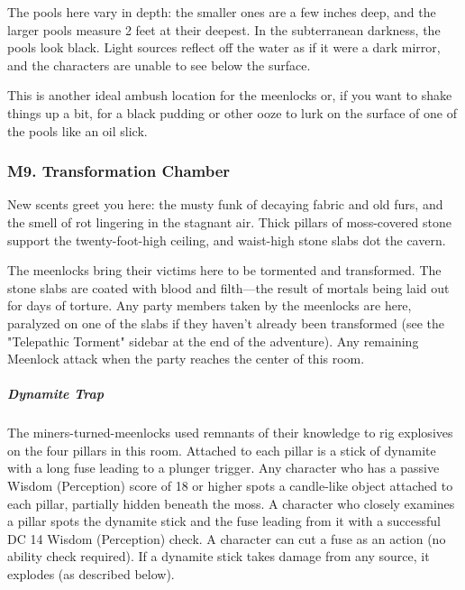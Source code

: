 \documentclass[10pt,a4paper,twoside,bg=print,twocolumn,openany,nodeprecatedcode]{dndbook}
\begin{document}
The pools here vary in depth: the smaller ones are a few inches deep, and the larger pools measure 2 feet at their deepest. In the subterranean darkness, the pools look black. Light sources reflect off the water as if it were a dark mirror, and the characters are unable to see below the surface.

This is another ideal ambush location for the meenlocks or, if you want to shake things up a bit, for a black pudding or other ooze to lurk on the surface of one of the pools like an oil slick.

\subsubsection{M9. Transformation Chamber}
\begin{DndReadAloud}{}
New scents greet you here: the musty funk of decaying fabric and old furs, and the smell of rot lingering in the stagnant air. Thick pillars of moss-covered stone support the twenty-foot-high ceiling, and waist-high stone slabs dot the cavern.

\end{DndReadAloud}

The meenlocks bring their victims here to be tormented and transformed. The stone slabs are coated with blood and filth—the result of mortals being laid out for days of torture. Any party members taken by the meenlocks are here, paralyzed on one of the slabs if they haven't already been transformed (see the "Telepathic Torment" sidebar at the end of the adventure). Any remaining Meenlock attack when the party reaches the center of this room.

\subparagraph{Dynamite Trap}
The miners-turned-meenlocks used remnants of their knowledge to rig explosives on the four pillars in this room. Attached to each pillar is a stick of dynamite with a long fuse leading to a plunger trigger. Any character who has a passive Wisdom (Perception) score of 18 or higher spots a candle-like object attached to each pillar, partially hidden beneath the moss. A character who closely examines a pillar spots the dynamite stick and the fuse leading from it with a successful DC 14 Wisdom (Perception) check. A character can cut a fuse as an action (no ability check required). If a dynamite stick takes damage from any source, it explodes (as described below).
\end{document}
